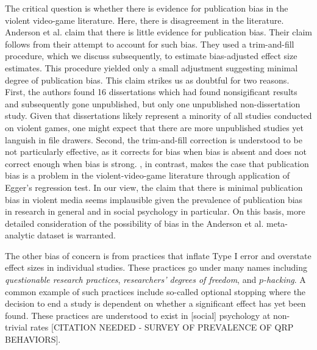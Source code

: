 \documentclass[man]{apa6}
\begin{document}
The critical question is whether there is evidence for publication bias in the violent video-game literature.  Here, there is disagreement in the literature.  Anderson et al. claim that there is little evidence for publication bias.  Their claim follows from their attempt to account for such bias.  They used a  trim-and-fill procedure, which we discuss subsequently, to estimate bias-adjusted effect size estimates. This procedure yielded only a small adjustment suggesting minimal degree of publication bias. This claim strikes us as doubtful for two reasons. First, the authors found 16 dissertations which had found nonsigificant results and subsequently gone unpublished, but only one unpublished non-dissertation study. Given that dissertations likely represent a minority of all studies conducted on violent games, one might expect that there are more unpublished studies yet languish in file drawers. Second, the trim-and-fill correction is understood to be not particularly effective, as it corrects for bias when bias is absent and does not correct enough when bias is strong.   \citet{Ferguson:2007a}, in contrast, makes the case that publication bias is a problem in the violent-video-game literature through application of Egger's regression test.  In our view, the claim that there is minimal publication bias in violent media seems implausible given the prevalence of publication bias in research in general and in social psychology in particular.  On this basis, more detailed consideration of the possibility of bias in the Anderson et al. meta-analytic dataset is warranted.

The other bias of concern is from practices that inflate Type I error and overstate effect sizes in individual studies.  These practices go under many names including {\em questionable research practices}, {\em researchers' degrees of freedom}, and {\em $p$-hacking}.  A common example of such practices include so-called optional stopping where the decision to end a study is dependent on whether a significant effect has yet been found.  These practices are understood to exist in [social] psychology at non-trivial rates [CITATION NEEDED - SURVEY OF PREVALENCE OF QRP BEHAVIORS].
\end{document}

